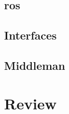 \documentclass[18pt,aspectratio=169]{beamer}
\begin{document}
\subsection{\acf{ros}}



\subsection{Interfaces}





\subsection{Middleman}




\section{Review}








\end{document}

